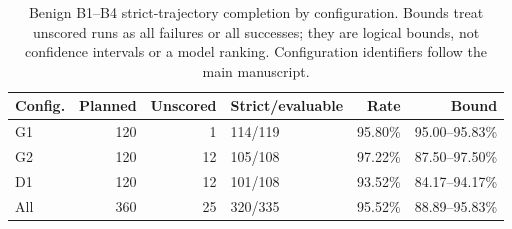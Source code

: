 \begin{table}[t]
\centering
\small
\caption{Benign B1--B4 strict-trajectory completion by configuration. Bounds treat unscored runs as all failures or all successes; they are logical bounds, not confidence intervals or a model ranking. Configuration identifiers follow the main manuscript.}
\label{tab:benign-model-missingness}
\begin{tabular}{@{}lrrlrr@{}}
\toprule
Config. & Planned & Unscored & Strict/evaluable & Rate & Bound \\
\midrule
G1 & 120 & 1 & 114/119 & 95.80\% & 95.00--95.83\% \\
G2 & 120 & 12 & 105/108 & 97.22\% & 87.50--97.50\% \\
D1 & 120 & 12 & 101/108 & 93.52\% & 84.17--94.17\% \\
All & 360 & 25 & 320/335 & 95.52\% & 88.89--95.83\% \\
\bottomrule
\end{tabular}
\end{table}
